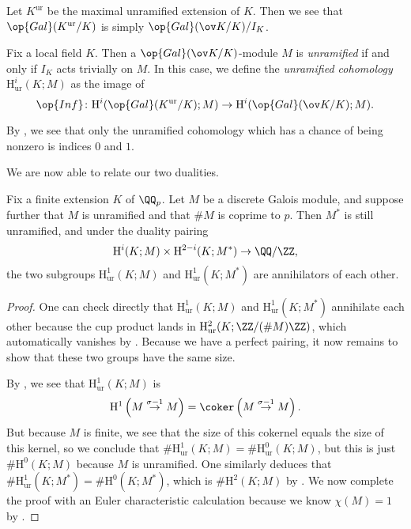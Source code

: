 \documentclass[../notes.tex]{subfiles}
\begin{document}
\begin{remark}
	Let $K^{\mathrm{ur}}$ be the maximal unramified extension of $K$. Then we see that $\op{Gal}(K^{\mathrm{ur}}/K)$ is simply $\op{Gal}(\ov K/K)/I_K$.
\end{remark}
\begin{definition}[unramified]
	Fix a local field $K$. Then a $\op{Gal}(\ov K/K)$-module $M$ is \textit{unramified} if and only if $I_K$ acts trivially on $M$. In this case, we define the \textit{unramified cohomology} $\mathrm H^i_{\mathrm{ur}}(K;M)$ as the image of
	\[\op{Inf}\colon\mathrm H^i(\op{Gal}(K^{\mathrm{ur}}/K);M)\to\mathrm H^i(\op{Gal}(\ov K/K);M).\]
\end{definition}
\begin{remark}
	By , we see that only the unramified cohomology which has a chance of being nonzero is indices $0$ and $1$.
\end{remark}
We are now able to relate our two dualities.
\begin{theorem}
	Fix a finite extension $K$ of $\QQ_p$. Let $M$ be a discrete Galois module, and suppose further that $M$ is unramified and that $\#M$ is coprime to $p$. Then $M^*$ is still unramified, and under the duality pairing
	\[\mathrm H^i(K;M)\times\mathrm H^{2-i}(K;M^*)\to\QQ/\ZZ,\]
	the two subgroups $\mathrm H^1_{\mathrm{ur}}(K;M)$ and $\mathrm H^1_{\mathrm{ur}}(K;M^*)$ are annihilators of each other.
\end{theorem}
\begin{proof}
	One can check directly that $\mathrm H^1_{\mathrm{ur}}(K;M)$ and $\mathrm H^1_{\mathrm{ur}}(K;M^*)$ annihilate each other because the cup product lands in $\mathrm H^2_{\mathrm{ur}}(K;\ZZ/(\#M)\ZZ)$, which automatically vanishes by . Because we have a perfect pairing, it now remains to show that these two groups have the same size.
	
	By , we see that $\mathrm H^1_{\mathrm{ur}}(K;M)$ is
	\[\mathrm H^1\left(M\stackrel{\sigma-1}\to M\right)=\coker\left(M\stackrel{\sigma-1}\to M\right).\]
	But because $M$ is finite, we see that the size of this cokernel equals the size of this kernel, so we conclude that $\#\mathrm H^1_{\mathrm{ur}}(K;M)=\#\mathrm H^0_{\mathrm{ur}}(K;M)$, but this is just $\#\mathrm H^0(K;M)$ because $M$ is unramified. One similarly deduces that $\#\mathrm H^1_{\mathrm{ur}}(K;M^*)=\#\mathrm H^0(K;M^*)$, which is $\#\mathrm H^2(K;M)$ by . We now complete the proof with an Euler characteristic calculation because we know $\chi(M)=1$ by .
\end{proof}
\end{document}

